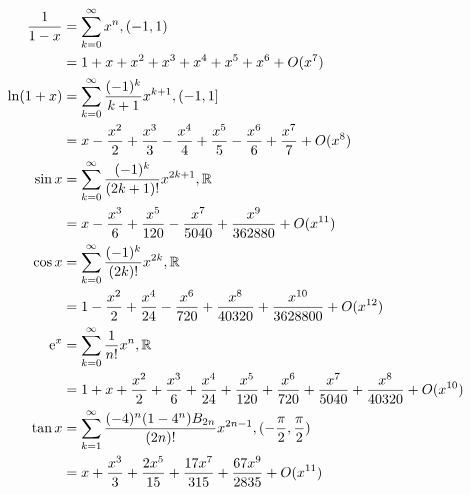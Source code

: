 \begin{equation*}
	\begin{aligned}
		\frac{1}{1-x} &= \sum_{k=0}^\infty x^n,(-1,1) \\
		&= 1 + x + x^2 + x^3 + x^4 + x^5 + x^6 + O(x^7)\\
		\ln(1+x) &= \sum_{k=0}^\infty\frac{(-1)^k}{k+1}x^{k+1},(-1,1] \\
		&= x - \frac{x^2}{2} + \frac{x^3}{3} - \frac{x^4}{4} + \frac{x^5}{5} - \frac{x^6}{6} + \frac{x^7}{7} + O(x^8)\\
		\sin x &= \sum_{k=0}^\infty \frac{(-1)^k}{(2k+1)!}x^{2k+1},\mathbb{R} \\
		&= x - \frac{x^3}{6} + \frac{x^5}{120} - \frac{x^7}{5040} + \frac{x^9}{362880}+ O(x^{11})\\
		\cos x &= \sum_{k=0}^\infty \frac{(-1)^k}{(2k)!}x^{2k},\mathbb{R} \\
		&= 1 - \frac{x^2}{2} + \frac{x^4}{24} - \frac{x^6}{720} + \frac{x^8}{40320} + \frac{x^{10}}{3628800} + O(x^{12})\\
		\mathrm{e}^x &= \sum_{k=0}^\infty\frac{1}{n!}x^n,\mathbb{R} \\
		&= 1 + x + \frac{x^2}{2} + \frac{x^3}{6} + \frac{x^4}{24} + \frac{x^5}{120} + \frac{x^6}{720} + \frac{x^7}{5040} + \frac{x^8}{40320} + O(x^{10})\\
		\tan x &= \sum_{k=1}^\infty \frac{(-4)^n(1-4^n)B_{2n}}{(2n)!}x^{2n-1},(-\frac{\pi}{2},\frac{\pi}{2}) \\
		&= x + \frac{x^3}{3} + \frac{2x^5}{15} + \frac{17x^{7}}{315} + \frac{67x^9}{2835} + O(x^{11})
	\end{aligned}
\end{equation*}